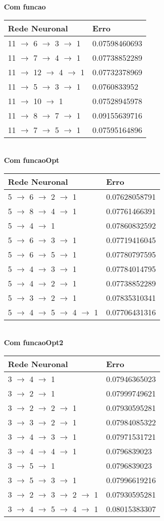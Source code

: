 \documentclass{article}
\begin{document}
\textbf{Com funcao}\\
\begin{tabular}{ | l | l | }
\hline
Rede Neuronal & Erro\\ \hline
11 $\to$ 6 $\to$ 3 $\to$ 1 & 0.07598460693\\ \hline
11 $\to$ 7 $\to$ 4 $\to$ 1 & 0.07738852289\\ \hline
11 $\to$ 12 $\to$ 4 $\to$ 1 & 0.07732378969\\ \hline
11 $\to$ 5 $\to$ 3 $\to$ 1 & 0.0760833952\\ \hline
11 $\to$ 10 $\to$ 1 & 0.07528945978\\ \hline
11 $\to$ 8 $\to$ 7 $\to$ 1 & 0.09155639716\\ \hline
11 $\to$ 7 $\to$ 5 $\to$ 1 & 0.07595164896\\ \hline
\end{tabular}
\\
\textbf{Com funcaoOpt}\\
\begin{tabular}{ | l | l | }
\hline
Rede Neuronal & Erro\\ \hline
5 $\to$ 6 $\to$ 2 $\to$ 1 & 0.07628058791\\ \hline
5 $\to$ 8 $\to$ 4 $\to$ 1 & 0.07761466391\\ \hline
5 $\to$ 4 $\to$ 1 & 0.07860832592\\ \hline
5 $\to$ 6 $\to$ 3 $\to$ 1 & 0.07719416045\\ \hline
5 $\to$ 6 $\to$ 5 $\to$ 1 & 0.07780797595\\ \hline
5 $\to$ 4 $\to$ 3 $\to$ 1 & 0.07784014795\\ \hline
5 $\to$ 4 $\to$ 2 $\to$ 1 & 0.07738852289\\ \hline
5 $\to$ 3 $\to$ 2 $\to$ 1 & 0.07835310341\\ \hline
5 $\to$ 4 $\to$ 5 $\to$ 4 $\to$ 1 & 0.07706431316\\ \hline
\end{tabular}
\\
\textbf{Com funcaoOpt2}\\
\begin{tabular}{ | l | l | }
\hline
Rede Neuronal & Erro\\ \hline
3 $\to$ 4 $\to$ 1 & 0.07946365023\\ \hline
3 $\to$ 2 $\to$ 1 & 0.07999749621\\ \hline
3 $\to$ 2 $\to$ 2 $\to$ 1 & 0.07930595281\\ \hline
3 $\to$ 3 $\to$ 2 $\to$ 1 & 0.07984085322\\ \hline
3 $\to$ 4 $\to$ 3 $\to$ 1 & 0.07971531721\\ \hline
3 $\to$ 4 $\to$ 4 $\to$ 1 & 0.0796839023\\ \hline
3 $\to$ 5 $\to$ 1 & 0.0796839023\\ \hline
3 $\to$ 5 $\to$ 3 $\to$ 1 & 0.07996619216\\ \hline
3 $\to$ 2 $\to$ 3 $\to$ 2 $\to$ 1 & 0.07930595281\\ \hline
3 $\to$ 4 $\to$ 5 $\to$ 4 $\to$ 1 & 0.08015383307\\ \hline
\end{tabular}
\end{document}
